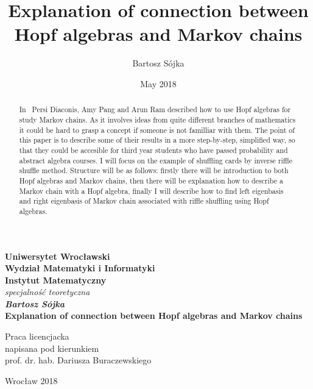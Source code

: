 \documentclass[a4paper]{article}
\title{Explanation of connection between Hopf algebras and Markov chains}
\author{Bartosz Sójka}
\date{May 2018}
\begin{document}
\thispagestyle{empty}
\begin{center}
\textbf{\large Uniwersytet Wrocławski\\
Wydział Matematyki i Informatyki\\
Instytut Matematyczny}\\
\textit{\large specjalność teoretyczna}\\
\vspace{4cm}
\textbf{\textit{\large Bartosz Sójka}\\
\vspace{0.5cm}
{\Large Explanation of connection between Hopf algebras and Markov chains}}\\
\end{center}
\vspace{3cm}
{\large \hspace*{6.5cm}Praca licencjacka\\
\hspace*{6.5cm}napisana pod kierunkiem\\
\hspace*{6.5cm}prof. dr. hab. Dariusza Buraczewskiego }\\
\vfill
\begin{center}
{\large Wrocław 2018}\\
\end{center}
\newpage

\begin{abstract}

In~\cite{Diaconis2014} Persi Diaconis, Amy Pang and Arun Ram described how to use Hopf algebras for
study Markov chains. As it involves ideas from quite different branches of mathematics it could be hard to
grasp a concept if someone is not familliar with them.
The point of this paper is to describe some of their results in a more step-by-step, simplified way,
so that they could be accesible for third year students who have passed probability
and abstract algebra courses. I will focus on the example of shuffling cards by inverse riffle shuffle method.
Structure will be as follows: firstly there will be introduction to both Hopf algebras and Markov chains,
then there will be explanation how to describe a Markov chain with a Hopf algebra, finally I will describe
how to find left eigenbasis and right eigenbasis of Markov chain associated with riffle shuffling
using Hopf algebras.


\end{abstract}
\end{document}
